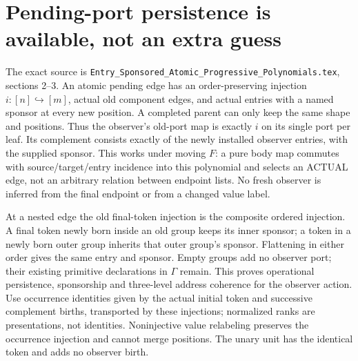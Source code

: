 \documentclass{article}
\begin{document}
\section{Pending-port persistence is available, not an extra guess}
The exact source is \texttt{Entry\_Sponsored\_Atomic\_Progressive\_Polynomials.tex}, sections 2--3. An atomic pending edge has an order-preserving injection $i:[n]\hookrightarrow[m]$, actual old component edges, and actual entries with a named sponsor at every new position. A completed parent can only keep the same shape and positions. Thus the observer's old-port map is exactly $i$ on its single port per leaf. Its complement consists exactly of the newly installed observer entries, with the supplied sponsor. This works under moving $F$: a pure body map commutes with source/target/entry incidence into this polynomial and selects an ACTUAL edge, not an arbitrary relation between endpoint lists. No fresh observer is inferred from the final endpoint or from a changed value label.

At a nested edge the old final-token injection is the composite ordered injection. A final token newly born inside an old group keeps its inner sponsor; a token in a newly born outer group inherits that outer group's sponsor. Flattening in either order gives the same entry and sponsor. Empty groups add no observer port; their existing primitive declarations in $\Gamma$ remain. This proves operational persistence, sponsorship and three-level address coherence for the observer action. Use occurrence identities given by the actual initial token and successive complement births, transported by these injections; normalized ranks are presentations, not identities. Noninjective value relabeling preserves the occurrence injection and cannot merge positions. The unary unit has the identical token and adds no observer birth.
\end{document}
